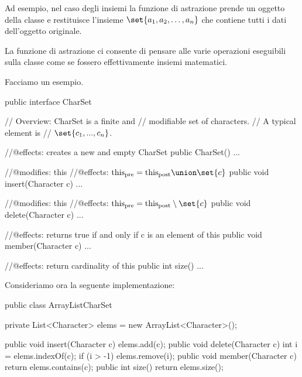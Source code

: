 Ad esempio, nel caso degli insiemi la funzione di astrazione prende un oggetto della classe  e restituisce l'insieme $\set{a_1, a_2, \dots, a_n}$ che contiene tutti i dati dell'oggetto originale.

La funzione di astrazione ci consente di pensare alle varie operazioni eseguibili sulla classe  come se fossero effettivamente insiemi matematici.

Facciamo un esempio.

\begin{Java}
public interface CharSet{
    // Overview: CharSet is a finite and 
    // modifiable set of characters.
    // A typical element is
    //          $\set{ c_1, ..., c_n }$.

    //@effects: creates a new and empty CharSet 
    public CharSet() {...}

    //@modifies: this
    //@effects: $\text{this}_\text{pre} = \text{this}_\text{post} \union \set{c}$
    public void insert(Character c) {...}

    //@modifies: this
    //@effects: $\text{this}_\text{pre} = \text{this}_\text{post} \setminus \set{c}$
    public void delete(Character c) {...}

    //@effects: returns true if and only if c is an element of this
    public void member(Character c) {...}

    //@effects: return cardinality of this
    public int size() {...}
}
\end{Java}

Consideriamo ora la seguente implementazione:
\begin{Java}
    public class ArrayListCharSet{
        private List<Character> elems = new ArrayList<Character>();

        public void insert(Character c) { elems.add(c); }
        public void delete(Character c) {
            int i = elems.indexOf(c);
            if (i > -1) elems.remove(i);
        }
        public void member(Character c) {
            return elems.contains(c);
        }
        public int size() {
            return elems.size();
        }
    }
\end{Java}